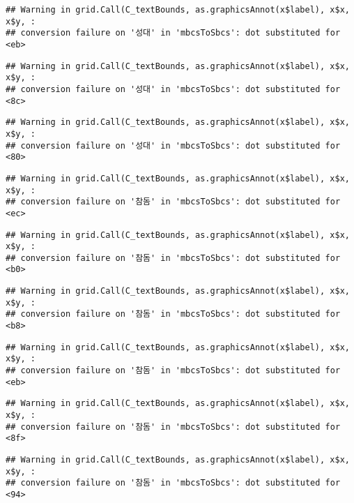 \documentclass[
]{article}
\begin{document}
\begin{verbatim}
## Warning in grid.Call(C_textBounds, as.graphicsAnnot(x$label), x$x, x$y, :
## conversion failure on '성대' in 'mbcsToSbcs': dot substituted for <eb>
\end{verbatim}

\begin{verbatim}
## Warning in grid.Call(C_textBounds, as.graphicsAnnot(x$label), x$x, x$y, :
## conversion failure on '성대' in 'mbcsToSbcs': dot substituted for <8c>
\end{verbatim}

\begin{verbatim}
## Warning in grid.Call(C_textBounds, as.graphicsAnnot(x$label), x$x, x$y, :
## conversion failure on '성대' in 'mbcsToSbcs': dot substituted for <80>
\end{verbatim}

\begin{verbatim}
## Warning in grid.Call(C_textBounds, as.graphicsAnnot(x$label), x$x, x$y, :
## conversion failure on '참돔' in 'mbcsToSbcs': dot substituted for <ec>
\end{verbatim}

\begin{verbatim}
## Warning in grid.Call(C_textBounds, as.graphicsAnnot(x$label), x$x, x$y, :
## conversion failure on '참돔' in 'mbcsToSbcs': dot substituted for <b0>
\end{verbatim}

\begin{verbatim}
## Warning in grid.Call(C_textBounds, as.graphicsAnnot(x$label), x$x, x$y, :
## conversion failure on '참돔' in 'mbcsToSbcs': dot substituted for <b8>
\end{verbatim}

\begin{verbatim}
## Warning in grid.Call(C_textBounds, as.graphicsAnnot(x$label), x$x, x$y, :
## conversion failure on '참돔' in 'mbcsToSbcs': dot substituted for <eb>
\end{verbatim}

\begin{verbatim}
## Warning in grid.Call(C_textBounds, as.graphicsAnnot(x$label), x$x, x$y, :
## conversion failure on '참돔' in 'mbcsToSbcs': dot substituted for <8f>
\end{verbatim}

\begin{verbatim}
## Warning in grid.Call(C_textBounds, as.graphicsAnnot(x$label), x$x, x$y, :
## conversion failure on '참돔' in 'mbcsToSbcs': dot substituted for <94>
\end{verbatim}
\end{document}
